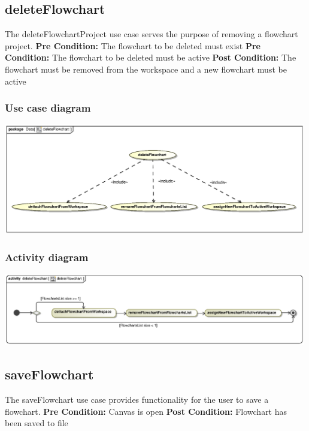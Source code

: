 \documentclass[11pt,a4paper,titlepage]{article}
\begin{document}
\newpage
\subsection{deleteFlowchart}
The deleteFlowchartProject use case serves the purpose of removing a flowchart project.\newline\newline
\textbf{Pre Condition:} The flowchart to be deleted must exist\newline
\textbf{Pre Condition:} The flowchart to be deleted must be active\newline\newline
\textbf{Post Condition:} The flowchart must be removed from the workspace and a new flowchart must be active

\subsubsection{Use case diagram}
\includegraphics[width=500px]{deleteFlowchart.eps}

\subsubsection{Activity diagram}
\includegraphics[width=500px]{deleteFlowchartActivity.eps}

\newpage
\subsection{saveFlowchart}
The saveFlowchart use case provides functionality for the user to save a flowchart.\newline\newline
\textbf{Pre Condition:} Canvas is open\newline\newline
\textbf{Post Condition:} Flowchart has been saved to file
\end{document}
